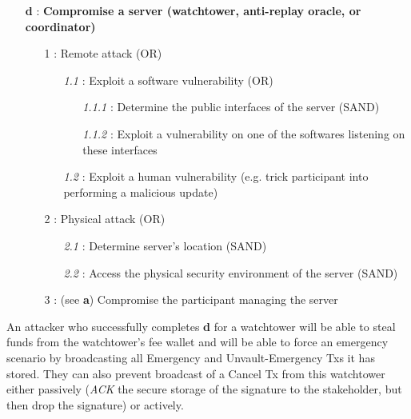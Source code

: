 \documentclass[runningheads]{llncs}
\begin{document}
{\footnotesize
\begin{itemize}[noitemsep,parsep=0pt,partopsep=0pt, leftmargin=0.7cm]
\item[\textbf{d} :] \textbf{Compromise a server (watchtower, anti-replay oracle, or coordinator)}
\begin{itemize}[noitemsep,topsep=0pt,parsep=0pt,partopsep=0pt, leftmargin=0.8cm]
\item[1 :] Remote attack (OR)
\begin{itemize}[noitemsep,topsep=0pt,parsep=0pt,partopsep=0pt, leftmargin=0.9cm]
\item[\textit{1.1} :] Exploit a software vulnerability (OR)
\begin{itemize}[noitemsep,topsep=0pt,parsep=0pt,partopsep=0pt, leftmargin=0.9cm]
\item[\textit{1.1.1} :] Determine the public interfaces of the server (SAND)
\item[\textit{1.1.2} :] Exploit a vulnerability on one of the softwares listening on these interfaces
\end{itemize}
\item[\textit{1.2} :] Exploit a human vulnerability (e.g. trick participant into performing a malicious update)
\end{itemize}
\item[2 :] Physical attack (OR)
\begin{itemize}[noitemsep,topsep=0pt,parsep=0pt,partopsep=0pt, leftmargin=0.9cm]
\item[\textit{2.1} :] Determine server's location (SAND)
\item[\textit{2.2} :] Access the physical security environment of the server (SAND)
\end{itemize}
\item[3 :] (see \textbf{a}) Compromise the participant managing the server
\end{itemize}
\end{itemize}
}

\noindent An attacker who successfully completes \textbf{d} for a watchtower will be able to steal funds from the watchtower's fee wallet and will be able to force an emergency scenario by broadcasting all Emergency and Unvault-Emergency Txs it has stored. They can also prevent broadcast of a Cancel Tx from this watchtower either passively (\textit{ACK} the secure storage of the signature to the stakeholder, but then drop the signature) or actively.
\end{document}
